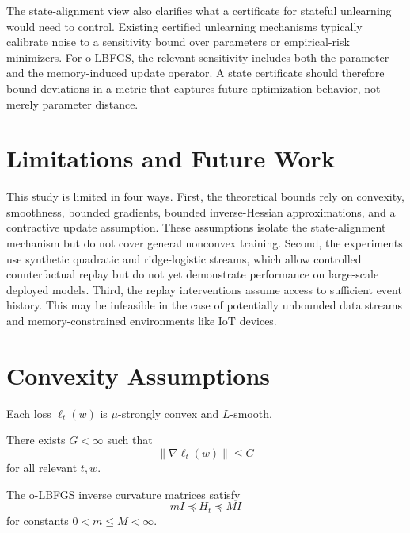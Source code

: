 \documentclass{ssl}
\begin{document}
The state-alignment view also clarifies what a certificate for stateful unlearning would need to control. Existing certified unlearning mechanisms typically calibrate noise to a sensitivity bound over parameters or empirical-risk minimizers. For o-LBFGS, the relevant sensitivity includes both the parameter and the memory-induced update operator. A state certificate should therefore bound deviations in a metric that captures future optimization behavior, not merely parameter distance.

\section{Limitations and Future Work}
This study is limited in four ways. First, the theoretical bounds rely on convexity, smoothness, bounded gradients, bounded inverse-Hessian approximations, and a contractive update assumption. These assumptions isolate the state-alignment mechanism but do not cover general nonconvex training. Second, the experiments use synthetic quadratic and ridge-logistic streams, which allow controlled counterfactual replay but do not yet demonstrate performance on large-scale deployed models. Third, the replay interventions assume access to sufficient event history. This may be infeasible in the case of potentially unbounded data streams and memory-constrained environments like IoT devices.

\newpage




\newpage

\appendix

\section{Convexity Assumptions}
\label{sec:convexity-assumptions}

\begin{assumption}
\label{assump: strong-convexity}
Each loss $\ell_t(w)$ is $\mu$-strongly convex and $L$-smooth.
\end{assumption}

\begin{assumption}
\label{assump: bounded-gradients}
There exists $G<\infty$ such that
\[
\|\nabla \ell_t(w)\|\le G
\]
for all relevant $t,w$.
\end{assumption}

\begin{assumption}
\label{assump: bounded-hessian}
The o-LBFGS inverse curvature matrices satisfy
\[
m I \preceq H_t \preceq M I
\]
for constants $0<m\le M<\infty$.
\end{assumption}
\end{document}
